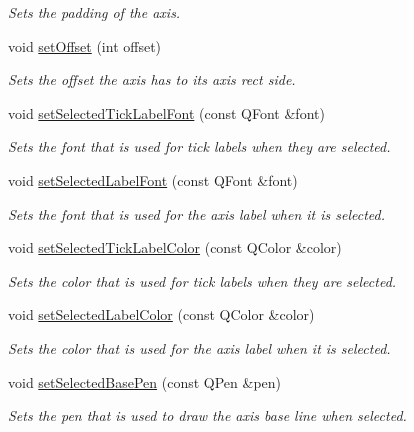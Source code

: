 \begin{DoxyCompactItemize}
\begin{DoxyCompactList}\small\item\em Sets the padding of the axis. \end{DoxyCompactList}\item 
void \hyperlink{classQCPAxis_a04a652603cbe50eba9969ee6d68873c3}{set\+Offset} (int offset)
\begin{DoxyCompactList}\small\item\em Sets the offset the axis has to its axis rect side. \end{DoxyCompactList}\item 
void \hyperlink{classQCPAxis_a845ccb560b7bc5281098a5be494145f6}{set\+Selected\+Tick\+Label\+Font} (const Q\+Font \&font)
\begin{DoxyCompactList}\small\item\em Sets the font that is used for tick labels when they are selected. \end{DoxyCompactList}\item 
void \hyperlink{classQCPAxis_a02ec2a75d4d8401eaab834fbc6803d30}{set\+Selected\+Label\+Font} (const Q\+Font \&font)
\begin{DoxyCompactList}\small\item\em Sets the font that is used for the axis label when it is selected. \end{DoxyCompactList}\item 
void \hyperlink{classQCPAxis_a9bdbf5e63ab15187f3a1de9440129227}{set\+Selected\+Tick\+Label\+Color} (const Q\+Color \&color)
\begin{DoxyCompactList}\small\item\em Sets the color that is used for tick labels when they are selected. \end{DoxyCompactList}\item 
void \hyperlink{classQCPAxis_a5d502dec597c634f491fdd73d151c72d}{set\+Selected\+Label\+Color} (const Q\+Color \&color)
\begin{DoxyCompactList}\small\item\em Sets the color that is used for the axis label when it is selected. \end{DoxyCompactList}\item 
void \hyperlink{classQCPAxis_aeb917a909215605b95ef2be843de1ee8}{set\+Selected\+Base\+Pen} (const Q\+Pen \&pen)
\begin{DoxyCompactList}\small\item\em Sets the pen that is used to draw the axis base line when selected. \end{DoxyCompactList}\item 

\end{DoxyCompactItemize}
